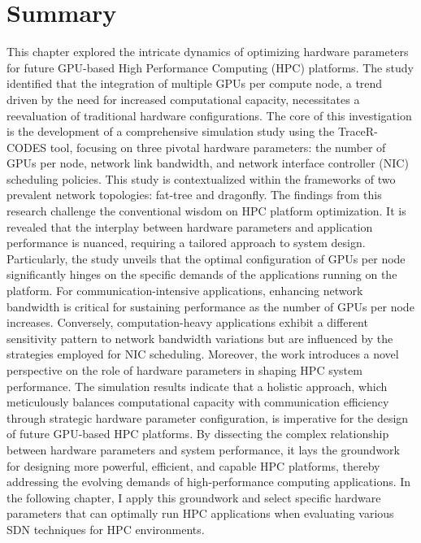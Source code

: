\section{Summary}
This chapter explored the intricate dynamics of optimizing hardware parameters for future GPU-based High Performance Computing (HPC) platforms. The study identified that the integration of multiple GPUs per compute node, a trend driven by the need for increased computational capacity, necessitates a reevaluation of traditional hardware configurations. The core of this investigation is the development of a comprehensive simulation study using the TraceR-CODES tool, focusing on three pivotal hardware parameters: the number of GPUs per node, network link bandwidth, and network interface controller (NIC) scheduling policies. This study is contextualized within the frameworks of two prevalent network topologies: fat-tree and dragonfly.
The findings from this research challenge the conventional wisdom on HPC platform optimization. It is revealed that the interplay between hardware parameters and application performance is nuanced, requiring a tailored approach to system design. Particularly, the study unveils that the optimal configuration of GPUs per node significantly hinges on the specific demands of the applications running on the platform. For communication-intensive applications, enhancing network bandwidth is critical for sustaining performance as the number of GPUs per node increases. Conversely, computation-heavy applications exhibit a different sensitivity pattern to network bandwidth variations but are influenced by the strategies employed for NIC scheduling.
Moreover, the work introduces a novel perspective on the role of hardware parameters in shaping HPC system performance. The simulation results indicate that a holistic approach, which meticulously balances computational capacity with communication efficiency through strategic hardware parameter configuration, is imperative for the design of future GPU-based HPC platforms.
By dissecting the complex relationship between hardware parameters and system performance, it lays the groundwork for designing more powerful, efficient, and capable HPC platforms, thereby addressing the evolving demands of high-performance computing applications.
In the following chapter, I apply this groundwork and select specific hardware parameters that can optimally run HPC applications when evaluating various SDN techniques for HPC environments.
